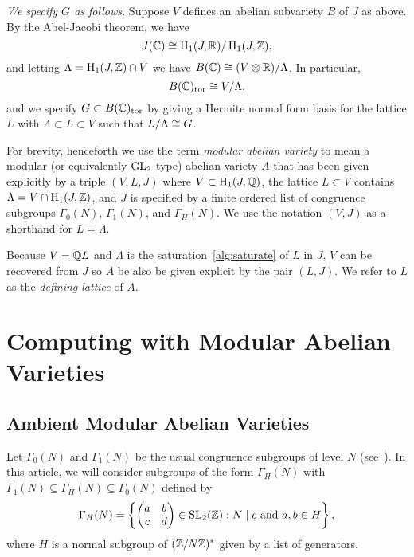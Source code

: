 \documentclass{article}
\begin{document}
{\em We specify $G$ as follows.}
Suppose $V$ defines an abelian subvariety $B$ of $J$ as above.
By the Abel-Jacobi theorem, we have
$$
J(\mathbb{C}) \cong \operatorname{H}_1(J, \mathbb{R}) / \operatorname{H}_1(J,\mathbb{Z}),
$$
and letting $\Lambda = \operatorname{H}_1(J,\mathbb{Z}) \cap V$ we have
$B(\mathbb{C}) \cong (V\otimes\mathbb{R}) / \Lambda$.
In particular,
$$
B(\mathbb{C})_{\operatorname{tor}} \cong V/\Lambda,
$$
and we specify $G\subset B(\mathbb{C})_{\operatorname{tor}}$ by giving a Hermite normal form basis
for the lattice $L$ with $\Lambda \subset L\subset V$ such that $L/\Lambda
\cong G$.


For brevity, henceforth we use the term {\em modular abelian variety}
to mean a modular (or equivalently $\operatorname{GL}_2$-type) abelian variety $A$
that has been given explicitly by a triple $(V,L,J)$ where $V\subset
\operatorname{H}_1(J,\mathbb{Q})$, the lattice $L\subset V$ contains $\Lambda = V\cap
\operatorname{H}_1(J,\mathbb{Z})$, and $J$ is specified by a finite ordered list of
congruence subgroups $\Gamma_0(N)$, $\Gamma_1(N)$, and $\Gamma_H(N)$.
We use the notation $(V,J)$ as a shorthand for $L=\Lambda$.  

Because $V = \mathbb{Q} L$ and $\Lambda$ is the saturation~\ref{alg:saturate} of $L$
in $J$, $V$ can be recovered from $J$ so $A$ be also be given explicit by the
pair $(L, J)$. We refer to $L$ as the \emph{defining lattice} of $A$.



\section{Computing with Modular Abelian Varieties}

\subsection{Ambient Modular Abelian Varieties}
\label{sec:amb_modabvar}

Let $\Gamma_0(N)$ and $\Gamma_1(N)$ be the usual congruence subgroups of level
$N$ (see~\cite{stein:modform}). In this article, we will consider subgroups of
the form $\Gamma_H(N)$ with $\Gamma_1(N)\subseteq \Gamma_H(N)\subseteq
\Gamma_0(N)$ defined by
\[
    \Gamma_H(N) =
    \left\{
        \begin{pmatrix}
            a & b \\
            c & d
        \end{pmatrix}
        \in \operatorname{SL}_2(\mathbb{Z}) :
        N\mid c \text{ and } a,b\in H
    \right\},
\]
where $H$ is a normal subgroup of $(\mathbb{Z}/N\mathbb{Z})^*$ given by a list of generators.
\end{document}
